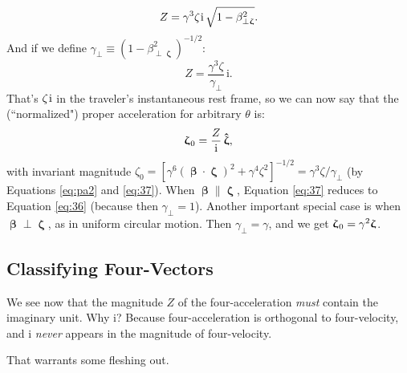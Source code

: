 \documentclass[12pt]{article}
\newcommand{\vvbeta}{\bm{\upbeta}}
\newcommand{\vvzeta}{\bm{\upzeta}}
\newcommand{\hatzeta}{\bm{\hat{\upzeta}}}
\begin{document}
\begin{equation*}
Z = \gamma^3 \zeta \mkern1mu \mathrm{i} \, \sqrt{1 - \beta_{\perp \vvzeta}^2}.
\end{equation*}
And if we define $\gamma_{\perp} \equiv (1 - \beta_{\perp \vvzeta}^2)^{-1/2}$:
\begin{equation}\label{eq:37}
Z = \frac{\gamma^3 \zeta}{\gamma_{\perp}} \, \mathrm{i}.
\end{equation}
That's $\zeta \mkern1mu \mathrm{i}$ in the traveler's instantaneous rest frame, so we can now say that the (``normalized") proper acceleration for arbitrary $\theta$ is:
\begin{equation}\label{eq:pa4}
\vvzeta_{\mkern1mu 0} = \dfrac{Z}{\mathrm{i}} \, \hatzeta ,
\end{equation}
with invariant magnitude $\zeta_0 = [ \gamma^6 (\vvbeta \cdot \vvzeta)^2 + \gamma^4 \zeta^2 ]^{-1/2} = \gamma^3 \zeta / \gamma_{\perp}$ (by Equations \ref{eq:pa2} and \ref{eq:37}). When $\vvbeta \parallel \vvzeta$, Equation \ref{eq:37} reduces to Equation \ref{eq:36} (because then $\gamma_{\perp} = 1$). Another important special case is when $\vvbeta \perp \vvzeta$, as in uniform circular motion. Then $\gamma_{\perp} = \gamma$, and we get $\vvzeta_{\mkern1mu 0} = \gamma^2 \vvzeta$.


\subsection{Classifying Four-Vectors}\label{ssec:cf}

We see now that the magnitude $Z$ of the four-acceleration \emph{must} contain the imaginary unit. Why $\mathrm{i}$? Because four-acceleration is orthogonal to four-velocity, and $\mathrm{i}$ \emph{never} appears in the magnitude of four-velocity.

That warrants some fleshing out.
\end{document}
